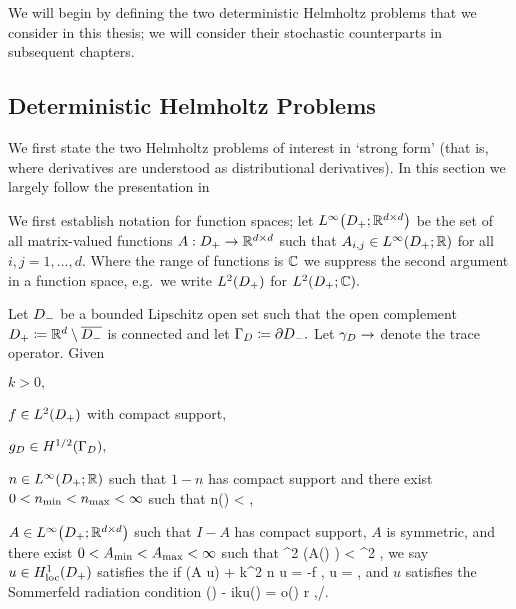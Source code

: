   We will begin by defining the two deterministic Helmholtz problems that we consider in this thesis; we will consider their stochastic counterparts in subsequent chapters.

\subsection{Deterministic Helmholtz Problems}\label{sec:detprobs}

We first state the two Helmholtz problems of interest in `strong form' (that is, where derivatives are understood as distributional derivatives). In this section we largely follow the presentation in \cite{GrPeSp:19}

We first establish notation for function spaces; let $\LiDpRRdtd$ be the set of all matrix-valued functions $A:D_{+}\rightarrow\mathbb R^{d\times d}$ such that $A_{i,j} \in \LiDpRR$ for all $i,j =   1,\ldots,d.$ Where the range of functions is $\mathbb C$ we suppress the second argument in a function space, e.g.~we write $\LtDp$ for $\LtDpCC.$

  \label{prob:edp}
  Let $D_{-}$ be a bounded Lipschitz open set such that the open complement $D_{+} \coloneqq \mathbb R^{d} \setminus \overline{D_{-}}$ is connected and let $\Gamma_{D} \coloneqq \partial D_{-}.$ Let $\gamma_{D}\rightarrow$ denote the trace operator. Given
  \bit
  \item $k > 0,$
\item $f \in \LtDp$ with compact support,
\item $\gD \in \HhGD,$
\item $n \in \LiDpRR$ such that $1-n$ has compact support and there exist $0 < n_{\min} < n_{\max} < \infty$ such that
  \beqs
\nmin \leq n(\bx) < \nmax \tfae \bx \in \Dp,
  \eeqs
\item $A \in \LiDpRRdtd$ such that $I-A$ has compact support, $A$ is symmetric, and there exist $0 < A_{\min} < A_{\max} < \infty$ such that
  \beqs
\Amin \abs{\bxi}^2 \leq \mleft(A(\bx) \bxi \mright) \cdot \bxibar < \Amax \abs{\bxi}^2 \tfa \bxi \in \CCd \tfae \bx \in \Dp,
  \eeqs
  \eit
  we say $u \in \HolocDp$ satisfies the  if
  \beq\label{eq:hhedp}
\grad \cdot \mleft(A \grad u\mright) + k^2 n u = -f \tin \Dp,
\eeq
\beq\label{eq:dbc}
\trGD u = \gD,
\eeq
and $u$ satisfies the Sommerfeld radiation condition
\beq\label{eq:sommerfeld}
\dudr(\bx) - iku(\bx) = o\mleft(\mright) r \de \abs{\bx} \rightarrow \infty,\bxhat \de \bx/\abs{\bx}.
\eeq
\eprob

